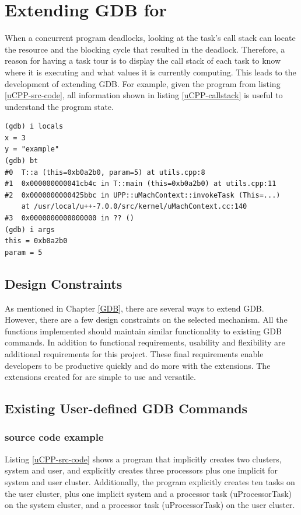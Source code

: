 \chapter{Extending GDB for \uCPP}
When a concurrent program deadlocks, looking at the task's call stack can locate
the resource and the blocking cycle that resulted in the deadlock. Therefore,
a reason for having a task tour is to display the call stack of each task to
know where it is executing and what values it is currently computing. This leads
to the development of extending GDB. For example, given the \uCPPS program from
listing \ref{uCPP-src-code}, all information shown in listing
\ref{uCPP-callstack} is useful to understand the program state.

\begin{lstlisting}[caption={Call stack of function \textbf{a()} in the \uCPPS
program from listing \ref{uCPP-src-code}}, label={uCPP-callstack}]
(gdb) i locals
x = 3
y = "example"
(gdb) bt
#0  T::a (this=0xb0a2b0, param=5) at utils.cpp:8
#1  0x000000000041cb4c in T::main (this=0xb0a2b0) at utils.cpp:11
#2  0x0000000000425bbc in UPP::uMachContext::invokeTask (This=...)
    at /usr/local/u++-7.0.0/src/kernel/uMachContext.cc:140
#3  0x0000000000000000 in ?? ()
(gdb) i args
this = 0xb0a2b0
param = 5
\end{lstlisting}
\section{Design Constraints}
As mentioned in Chapter \ref{GDB}, there are several ways to extend GDB. However,
there are a few design constraints on the selected mechanism. All the functions
implemented should maintain similar functionality to existing GDB commands. In addition to functional
requirements, usability and flexibility are additional requirements for this
project. These final requirements enable developers to be productive quickly
and do more with the extensions. The extensions created for \uCPPS are simple
to use and versatile.

\section{Existing User-defined GDB Commands}
\subsection{\uCPPS source code example}
Listing \ref{uCPP-src-code} shows a \uCPPS program that implicitly creates two
clusters, system and user, and explicitly creates three processors plus one
implicit for system and user cluster. Additionally, the program explicitly
creates ten tasks on the user cluster, plus one implicit system and a processor task (uProcessorTask) on the system cluster, and
a processor task (uProcessorTask) on the user cluster.


